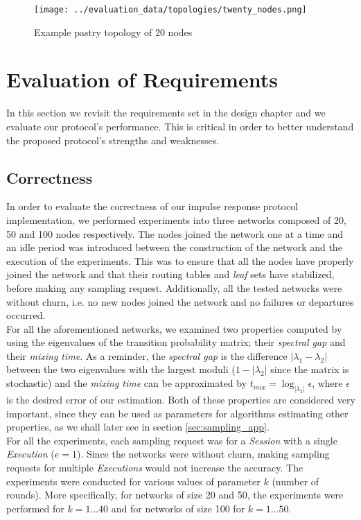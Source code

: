\documentclass[a4paper,11pt,twoside]{report}
\begin{document}
\begin{figure}
   \centering
    \texttt{[image: ../evaluation\_data/topologies/twenty\_nodes.png]}
     \caption{Example pastry topology of 20 nodes}
     \label{fig:pastry_eval}
\end{figure}

\section{Evaluation of Requirements}

In this section we revisit the requirements set in the design chapter and we evaluate our protocol's performance. This is critical in order to better understand the proposed protocol's strengths and weaknesses.

\subsection{Correctness}

In order to evaluate the correctness of our impulse response protocol implementation, we performed experiments into three networks composed of 20, 50 and 100 nodes respectively. The nodes joined the network one at a time and an idle period was introduced between the construction of the network and the execution of the experiments. This was to ensure that all the nodes have properly joined the network and that their routing tables and \textit{leaf} sets have stabilized, before making any sampling request. Additionally, all the tested networks were without churn, i.e. no new nodes joined the network and no failures or departures occurred.\\

For all the aforementioned networks, we examined two properties computed by using the eigenvalues of the transition probability matrix; their \textit{spectral gap} and their \textit{mixing time}. As a reminder, the \textit{spectral gap} is the difference  $|\lambda_1 - \lambda_2|$ between the two eigenvalues with the largest moduli ($1-|\lambda_2|$ since the matrix is stochastic) and the \textit{mixing time} can be approximated by $t_{mix} = \log _{|\lambda_2|}\epsilon$, where $\epsilon$ is the desired error of our estimation. Both of these properties are considered very important, since they can be used as parameters for algorithms estimating other properties, as we shall later see in section \ref{sec:sampling_app}.\\

For all the experiments, each sampling request was for a \textit{Session} with a single \textit{Execution} ($e=1$). Since the networks were without churn, making sampling requests for multiple \textit{Executions} would not increase the accuracy. The experiments were conducted for various values of parameter $k$ (number of rounds). More specifically, for networks of size 20 and 50, the experiments were performed for $k=1\dots40$ and for networks of size 100 for $k=1\dots50$. \\
\end{document}
